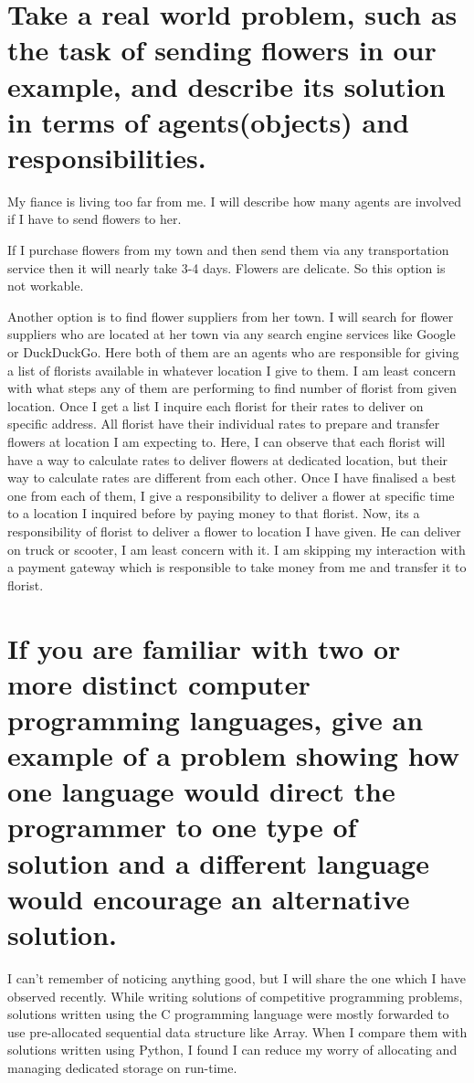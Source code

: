 \section{
  Take a real world problem, such as the task of sending flowers in our
  example, and describe its solution in terms of agents(objects) and
  responsibilities.
}

  My fiance is living too far from me. I will describe how many agents are
  involved if I have to send flowers to her.

  If I purchase flowers from my town and then send them via any transportation
  service then it will nearly take 3-4 days. Flowers are delicate. So this
  option is not workable.

  Another option is to find flower suppliers from her town. I will search for
  flower suppliers who are located at her town via any search engine services
  like Google or DuckDuckGo. Here both of them are an agents who are
  responsible for giving a list of florists available in whatever location I
  give to them. I am least concern with what steps any of them are performing
  to find number of florist from given location. Once I get a list I inquire
  each florist for their rates to deliver on specific address. All florist have
  their individual rates to prepare and transfer flowers at location I am
  expecting to. Here, I can observe that each florist will have a way to
  calculate rates to deliver flowers at dedicated location, but their way to
  calculate rates are different from each other. Once I have finalised a best
  one from each of them, I give a responsibility to deliver a flower at
  specific time to a location I inquired before by paying money to that
  florist. Now, its a responsibility of florist to deliver a flower to location
  I have given. He can deliver on truck or scooter, I am least concern with it.
  I am skipping my interaction with a payment gateway which is responsible to
  take money from me and transfer it to florist.

\section{
  If you are familiar with two or more distinct computer programming languages,
  give an example of a problem showing how one language would direct the
  programmer to one type of solution and a different language would encourage
  an alternative solution.
}


  I can't remember of noticing anything good, but I will share the one which I
  have observed recently. While writing solutions of competitive programming
  problems, solutions written using the C programming language were mostly
  forwarded to use pre-allocated sequential data structure like Array. When I
  compare them with solutions written using Python, I found I can reduce my
  worry of allocating and managing dedicated storage on run-time.

